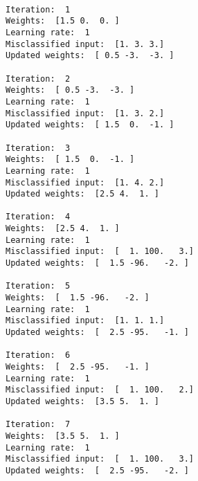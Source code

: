 \documentclass[11pt]{article}
\begin{document}
    \begin{Verbatim}[commandchars=\\\{\}]

Iteration:  1
Weights:  [1.5 0.  0. ]
Learning rate:  1
Misclassified input:  [1. 3. 3.]
Updated weights:  [ 0.5 -3.  -3. ]

Iteration:  2
Weights:  [ 0.5 -3.  -3. ]
Learning rate:  1
Misclassified input:  [1. 3. 2.]
Updated weights:  [ 1.5  0.  -1. ]

Iteration:  3
Weights:  [ 1.5  0.  -1. ]
Learning rate:  1
Misclassified input:  [1. 4. 2.]
Updated weights:  [2.5 4.  1. ]

Iteration:  4
Weights:  [2.5 4.  1. ]
Learning rate:  1
Misclassified input:  [  1. 100.   3.]
Updated weights:  [  1.5 -96.   -2. ]

Iteration:  5
Weights:  [  1.5 -96.   -2. ]
Learning rate:  1
Misclassified input:  [1. 1. 1.]
Updated weights:  [  2.5 -95.   -1. ]

Iteration:  6
Weights:  [  2.5 -95.   -1. ]
Learning rate:  1
Misclassified input:  [  1. 100.   2.]
Updated weights:  [3.5 5.  1. ]

Iteration:  7
Weights:  [3.5 5.  1. ]
Learning rate:  1
Misclassified input:  [  1. 100.   3.]
Updated weights:  [  2.5 -95.   -2. ]

Iteration:  8
Weights:  [  2.5 -95.   -2. ]
Learning rate:  1
Misclassified input:  [  1. 100.   2.]
Updated weights:  [3.5 5.  0. ]

Iteration:  9
Weights:  [3.5 5.  0. ]
Learning rate:  1
Misclassified input:  [1. 5. 3.]
Updated weights:  [ 2.5  0.  -3. ]

Iteration:  10
Weights:  [ 2.5  0.  -3. ]
Learning rate:  1
Misclassified input:  [1. 1. 1.]
Updated weights:  [ 3.5  1.  -2. ]

Iteration:  11
Weights:  [ 3.5  1.  -2. ]
Learning rate:  1
Misclassified input:  [1. 3. 3.]
Updated weights:  [ 2.5 -2.  -5. ]

Iteration:  12
Weights:  [ 2.5 -2.  -5. ]
Learning rate:  1
Misclassified input:  [1. 1. 2.]
Updated weights:  [ 3.5 -1.  -3. ]

Iteration:  13
Weights:  [ 3.5 -1.  -3. ]
Learning rate:  1
Misclassified input:  [1. 1. 2.]
Updated weights:  [ 4.5  0.  -1. ]

Iteration:  14
Weights:  [ 4.5  0.  -1. ]
Learning rate:  1
Misclassified input:  [1. 5. 3.]
Updated weights:  [ 3.5 -5.  -4. ]

Iteration:  15
Weights:  [ 3.5 -5.  -4. ]
Learning rate:  1
Misclassified input:  [1. 4. 1.]
Updated weights:  [ 4.5 -1.  -3. ]


\end{Verbatim}
\end{document}
